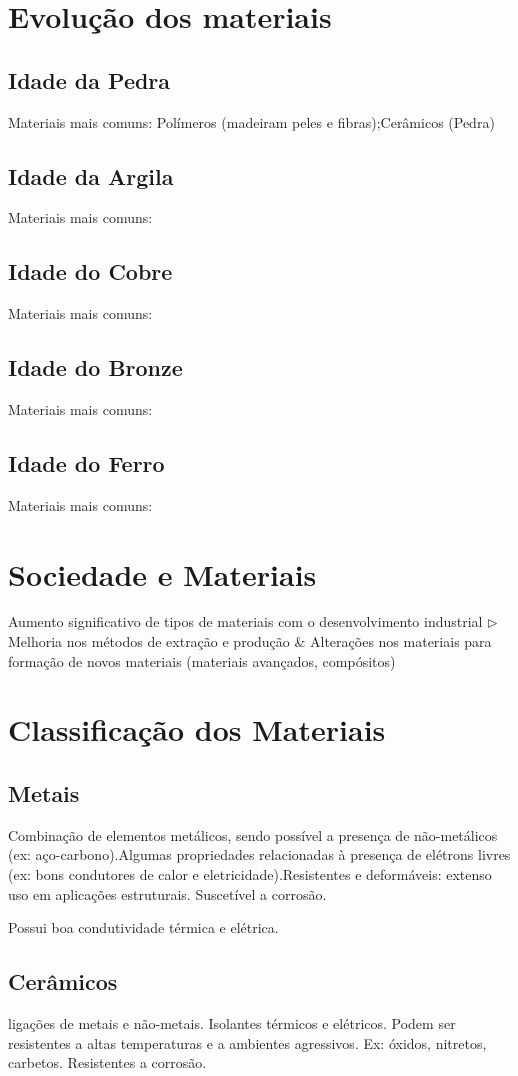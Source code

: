 \section{Evolução dos materiais}
\subsection*{Idade da Pedra}
Materiais mais comuns: Polímeros (madeiram peles e fibras);Cerâmicos (Pedra)
\subsection*{Idade da Argila}
Materiais mais comuns: 
\subsection*{Idade do Cobre}
Materiais mais comuns: 
\subsection*{Idade do Bronze}
Materiais mais comuns: 
\subsection*{Idade do Ferro}
Materiais mais comuns: 
\section{Sociedade e Materiais}
Aumento significativo de tipos de materiais com o desenvolvimento industrial $\rhd$ Melhoria nos métodos de extração e produção \& Alterações nos materiais para formação de novos materiais (materiais avançados, compósitos)
\section{Classificação dos Materiais}
\subsection*{Metais}
Combinação de elementos metálicos, sendo possível a presença de não-metálicos (ex: aço-carbono).Algumas propriedades relacionadas à presença de elétrons livres (ex: bons condutores de calor e eletricidade).Resistentes e deformáveis: extenso uso em aplicações estruturais.
Suscetível a corrosão.

Possui boa condutividade térmica e elétrica.
\subsection*{Cerâmicos}
ligações de metais e não-metais. Isolantes térmicos e elétricos. Podem ser resistentes a altas temperaturas e a ambientes agressivos. Ex: óxidos, nitretos, carbetos.
Resistentes a corrosão.

